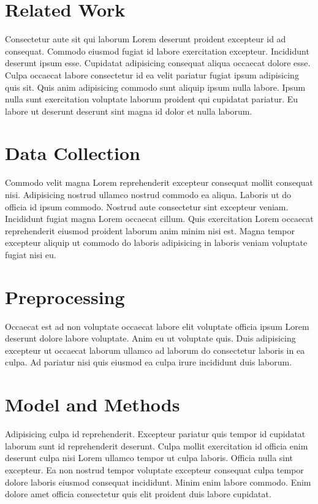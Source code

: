 \section{Related Work}


Consectetur aute sit qui laborum Lorem deserunt proident excepteur id ad consequat. Commodo eiusmod fugiat id labore exercitation excepteur. Incididunt deserunt ipsum esse. Cupidatat adipisicing consequat aliqua occaecat dolore esse. Culpa occaecat labore consectetur id ea velit pariatur fugiat ipsum adipisicing quis sit. Quis anim adipisicing commodo sunt aliquip ipsum nulla labore. Ipsum nulla sunt exercitation voluptate laborum proident qui cupidatat pariatur. Eu labore ut deserunt deserunt sint magna id dolor et nulla laborum.

\section{Data Collection}

Commodo velit magna Lorem reprehenderit excepteur consequat mollit consequat nisi. Adipisicing nostrud ullamco nostrud commodo ea aliqua. Laboris ut do officia id ipsum commodo. Nostrud aute consectetur sint excepteur veniam. Incididunt fugiat magna Lorem occaecat cillum. Quis exercitation Lorem occaecat reprehenderit eiusmod proident laborum anim minim nisi est. Magna tempor excepteur aliquip ut commodo do laboris adipisicing in laboris veniam voluptate fugiat nisi eu.

\section{Preprocessing}

Occaecat est ad non voluptate occaecat labore elit voluptate officia ipsum Lorem deserunt dolore labore voluptate. Anim eu ut voluptate quis. Duis adipisicing excepteur ut occaecat laborum ullamco ad laborum do consectetur laboris in ea culpa. Ad pariatur nisi quis eiusmod ea culpa irure incididunt duis laborum.

\section{Model and Methods}

Adipisicing culpa id reprehenderit. Excepteur pariatur quis tempor id cupidatat laborum sunt id reprehenderit deserunt. Culpa mollit exercitation id officia enim deserunt culpa nisi Lorem ullamco tempor ut culpa laboris. Officia nulla sint excepteur. Ea non nostrud tempor voluptate excepteur consequat culpa tempor dolore laboris eiusmod consequat incididunt. Minim enim labore commodo. Enim dolore amet officia consectetur quis elit proident duis labore cupidatat.

